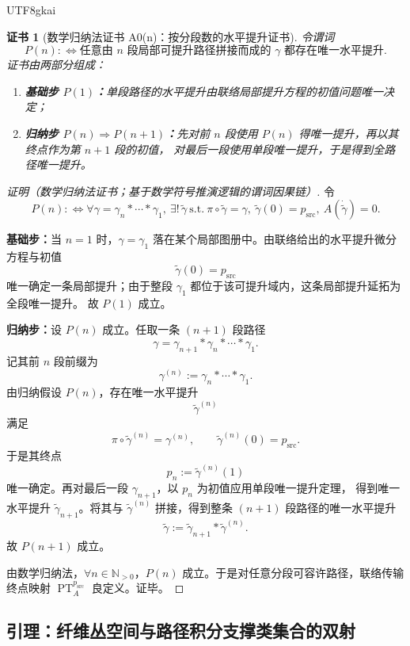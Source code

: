 \documentclass[12pt]{article}
\newtheorem{Certificate}{证书}[section]
\newcommand{\NN}{\mathbb{N}}
\newcommand{\PT}{\operatorname{PT}}
\begin{document}
\begin{CJK*}{UTF8}{gkai}
\begin{Certificate}[数学归纳法证书 A0(n)：按分段数的水平提升证书]
\label{cert:tex36-a0}
令谓词
\[
  P(n)
  :
  \Longleftrightarrow
  \text{任意由 $n$ 段局部可提升路径拼接而成的 $\gamma$ 都存在唯一水平提升}.
\]
证书由两部分组成：
\begin{enumerate}
  \item \textbf{基础步 $P(1)$：}单段路径的水平提升由联络局部提升方程的初值问题唯一决定；
  \item \textbf{归纳步 $P(n)\Rightarrow P(n+1)$：}先对前 $n$ 段使用 $P(n)$ 得唯一提升，再以其终点作为第 $n+1$ 段的初值，
  对最后一段使用单段唯一提升，于是得到全路径唯一提升。
\end{enumerate}
\end{Certificate}

\begin{proof}[证明（数学归纳法证书；基于数学符号推演逻辑的谓词因果链）]
令
\[
  P(n)
  :
  \Longleftrightarrow
  \forall \gamma=\gamma_n*\cdots *\gamma_1,\
  \exists!\,\widetilde{\gamma}\ \text{s.t.}\
  \pi\circ\widetilde{\gamma}=\gamma,\
  \widetilde{\gamma}(0)=p_{\mathrm{src}},\
  A(\dot{\widetilde{\gamma}})=0.
\]

\textbf{基础步：}当 $n=1$ 时，$\gamma=\gamma_1$ 落在某个局部图册中。由联络给出的水平提升微分方程与初值
\[
  \widetilde{\gamma}(0)=p_{\mathrm{src}}
\]
唯一确定一条局部提升；由于整段 $\gamma_1$ 都位于该可提升域内，这条局部提升延拓为全段唯一提升。
故 $P(1)$ 成立。

\textbf{归纳步：}设 $P(n)$ 成立。任取一条 $(n+1)$ 段路径
\[
  \gamma=\gamma_{n+1}*\gamma_n*\cdots *\gamma_1.
\]
记其前 $n$ 段前缀为
\[
  \gamma^{(n)}:=\gamma_n*\cdots *\gamma_1.
\]
由归纳假设 $P(n)$，存在唯一水平提升
\[
  \widetilde{\gamma}^{(n)}
\]
满足
\[
  \pi\circ \widetilde{\gamma}^{(n)}=\gamma^{(n)},\qquad
  \widetilde{\gamma}^{(n)}(0)=p_{\mathrm{src}}.
\]
于是其终点
\[
  p_n:=\widetilde{\gamma}^{(n)}(1)
\]
唯一确定。再对最后一段 $\gamma_{n+1}$，以 $p_n$ 为初值应用单段唯一提升定理，
得到唯一水平提升 $\widetilde{\gamma}_{n+1}$。将其与 $\widetilde{\gamma}^{(n)}$ 拼接，得到整条 $(n+1)$ 段路径的唯一水平提升
\[
  \widetilde{\gamma}:=\widetilde{\gamma}_{n+1}*\widetilde{\gamma}^{(n)}.
\]
故 $P(n+1)$ 成立。

由数学归纳法，$\forall n\in\NN_{>0}$，$P(n)$ 成立。于是对任意分段可容许路径，联络传输终点映射 $\PT_A^{p_{\mathrm{src}}}$ 良定义。证毕。
\end{proof}

\subsection{引理：纤维丛空间与路径积分支撑类集合的双射}
\label{subsec:tex36-lemma}


\end{CJK*}
\end{document}

